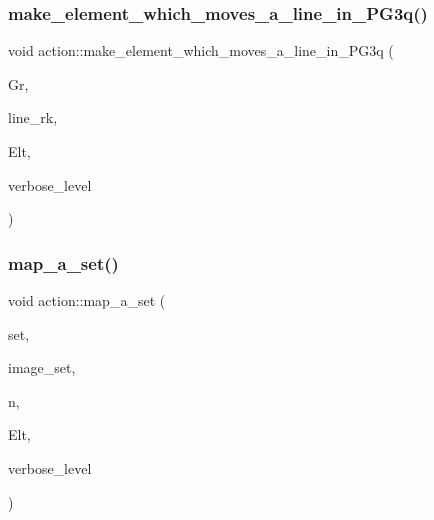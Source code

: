 \subsubsection{\texorpdfstring{make\+\_\+element\+\_\+which\+\_\+moves\+\_\+a\+\_\+line\+\_\+in\+\_\+\+P\+G3q()}{make\_element\_which\_moves\_a\_line\_in\_PG3q()}}
{\footnotesize\ttfamily void action\+::make\+\_\+element\+\_\+which\+\_\+moves\+\_\+a\+\_\+line\+\_\+in\+\_\+\+P\+G3q (\begin{DoxyParamCaption}\item[{\mbox{\hyperlink{classgrassmann}{grassmann}} $\ast$}]{Gr,  }\item[{\mbox{\hyperlink{galois_8h_a09fddde158a3a20bd2dcadb609de11dc}{I\+NT}}}]{line\+\_\+rk,  }\item[{\mbox{\hyperlink{galois_8h_a09fddde158a3a20bd2dcadb609de11dc}{I\+NT}} $\ast$}]{Elt,  }\item[{\mbox{\hyperlink{galois_8h_a09fddde158a3a20bd2dcadb609de11dc}{I\+NT}}}]{verbose\+\_\+level }\end{DoxyParamCaption})}

\mbox{\label{classaction_a600e542e5aeca2a46f18110e027947e0}} 
\subsubsection{\texorpdfstring{map\+\_\+a\+\_\+set()}{map\_a\_set()}}
{\footnotesize\ttfamily void action\+::map\+\_\+a\+\_\+set (\begin{DoxyParamCaption}\item[{\mbox{\hyperlink{galois_8h_a09fddde158a3a20bd2dcadb609de11dc}{I\+NT}} $\ast$}]{set,  }\item[{\mbox{\hyperlink{galois_8h_a09fddde158a3a20bd2dcadb609de11dc}{I\+NT}} $\ast$}]{image\+\_\+set,  }\item[{\mbox{\hyperlink{galois_8h_a09fddde158a3a20bd2dcadb609de11dc}{I\+NT}}}]{n,  }\item[{\mbox{\hyperlink{galois_8h_a09fddde158a3a20bd2dcadb609de11dc}{I\+NT}} $\ast$}]{Elt,  }\item[{\mbox{\hyperlink{galois_8h_a09fddde158a3a20bd2dcadb609de11dc}{I\+NT}}}]{verbose\+\_\+level }\end{DoxyParamCaption})}

\mbox{\label{classaction_affe38c85a0ff3cb34d233afa7b4aea35}} 
